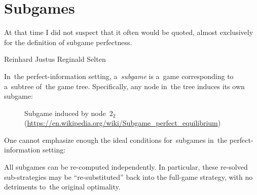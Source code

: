 \section{Subgames}
\epigraph{
  At that time I did not suspect that it\footnotemark{} often would be quoted, almost exclusively for the definition of subgame perfectness.
}{Reinhard Justus Reginald Selten}
In~the perfect-information setting, a~\emph{subgame} is a~game corresponding to a~subtree of~the game tree.
Specifically, any node in~the tree induces its own subgame:
\begin{figure}[H]
  \centering
  \scriptsize
  \def\svgwidth{.7\textwidth}
  
  \def\captionTitle{Subgame induced by node~$2_2$}
  \caption[\captionTitle]{\captionTitle{}\\ (\href{https://en.wikipedia.org/wiki/Subgame_perfect_equilibrium}{https://en.wikipedia.org/wiki/Subgame\_perfect\_equilibrium})}
  \label{fig:ext-form-subgame}
\end{figure}

One cannot emphasize enough the ideal conditions for~subgames in~the perfect-information setting:

\begin{thm}
  All subgames can be re-computed independently.
  In particular, these re-solved sub-strategies may be ``re-substituted'' back into the full-game strategy, with no detriments to~the original optimality.
\end{thm}

